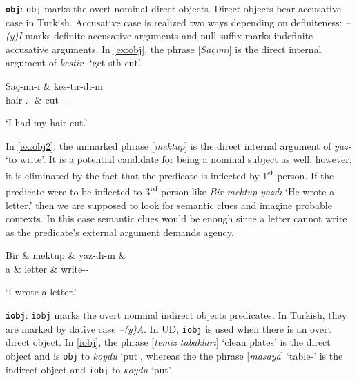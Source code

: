 \documentclass[11pt,a4paper]{article}
\begin{document}
\textbf{\texttt{obj}}: \texttt{obj} marks the overt nominal direct objects. Direct objects bear accusative case in Turkish. Accusative case is realized two ways depending on definiteness: \textit{–(y)I} marks definite accusative arguments and null suffix marks indefinite accusative arguments. In \autoref{ex:obj}, the phrase [\textit{Saçımı}] is the direct internal argument of \textit{kestir-} `get sth cut'.

\begin{exe}
\ex \label{ex:obj}
\begin{dependency}
\begin{deptext}
Saç-ım-ı \& kes-tir-di-m \\ hair-\Poss{}.\Fsg{}-\Acc{} \& cut-\Caus{}-\Pst{}-\Fsg{} \\
\end{deptext}
\end{dependency}
\glt `I had my hair cut.'
\end{exe}

In \autoref{ex:obj2}, the unmarked phrase [\textit{mektup}] is the direct internal argument of \textit{yaz-} `to write'. It is a potential candidate for being a nominal subject as well; however, it is eliminated by the fact that the predicate is inflected by 1\textsuperscript{st} person. If the predicate were to be inflected to 3\textsuperscript{rd} person like \textit{Bir mektup yazdı} ‘He wrote a letter.’ then we are supposed to look for semantic clues and imagine probable contexts. In this case semantic clues would be enough since a letter cannot write as the predicate’s external argument demands agency.

\begin{exe}
\ex \label{ex:obj2}
\begin{dependency}
\begin{deptext}
Bir \& mektup \& yaz-dı-m \& \\ a \& letter \& write-\Pst{}-{\Fsg} \\
\end{deptext}
\end{dependency}
\glt `I wrote a letter.'
\end{exe}

\textbf{\texttt{iobj}}:
\texttt{iobj} marks the overt nominal indirect objects predicates. In Turkish, they are marked by dative case \textit{–(y)A}. In UD, \texttt{iobj} is used when there is an overt direct object. In \autoref{iobj}, the phrase [\textit{temiz tabakları}] `clean plates' is the direct object and is \texttt{obj} to \textit{koydu} `put', whereas the the phrase [\textit{masaya}] `table-{\Dat}' is the indirect object and \texttt{iobj} to \textit{koydu} `put'.
\end{document}
